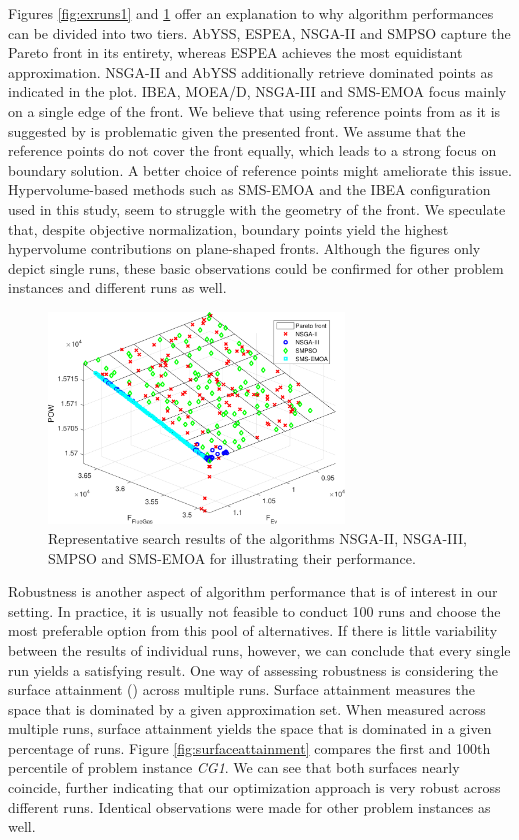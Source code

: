 Figures \ref{fig:exruns1} and \ref{fig:exruns2} offer an explanation to why algorithm performances can be divided into two tiers. AbYSS, ESPEA, NSGA-II and SMPSO capture the Pareto front in its entirety, whereas ESPEA achieves the most equidistant approximation. NSGA-II and AbYSS additionally retrieve dominated points as indicated in the plot. IBEA, MOEA/D, NSGA-III and SMS-EMOA focus mainly on a single edge of the front. We believe that using reference points from \cite{nbi} as it is suggested by \cite{moead2009,nsga3part1} is problematic given the presented front. We assume that the reference points do not cover the front equally, which leads to a strong focus on boundary solution. A better choice of reference points might ameliorate this issue. Hypervolume-based methods such as SMS-EMOA and the IBEA configuration used in this study, seem to struggle with the geometry of the front. We speculate that, despite objective normalization, boundary points yield the highest hypervolume contributions on plane-shaped fronts. Although the figures only depict single runs, these basic observations could be confirmed for other problem instances and different runs as well.

\begin{figure}
\centering
\includegraphics[width=0.7\textwidth]{figures/example2_cropped.pdf}
\caption{Representative search results of the algorithms NSGA-II, NSGA-III, SMPSO and SMS-EMOA for illustrating their performance.}
\label{fig:exruns2}
\end{figure}

Robustness is another aspect of algorithm performance that is of interest in our setting. In practice, it is usually not feasible to conduct 100 runs and choose the most preferable option from this pool of alternatives. If there is little variability between the results of individual runs, however, we can conclude that every single run yields a satisfying result. One way of assessing robustness is considering the surface attainment (\cite{fonseca1996performance}) across multiple runs. Surface attainment measures the space that is dominated by a given approximation set. When measured across multiple runs, surface attainment yields the space that is dominated in a given percentage of runs. Figure \ref{fig:surfaceattainment} compares the first and 100th percentile of problem instance \textit{CG1}. We can see that both surfaces nearly coincide, further indicating that our optimization approach is very robust across different runs. Identical observations were made for other problem instances as well.

